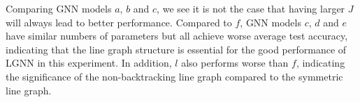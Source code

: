 \documentclass{article} \usepackage{iclr2019_conference,times}
\begin{document}
Comparing GNN models $a$, $b$ and $c$, we see it is not the case that having larger $J$ will always lead to better performance. Compared to $f$, GNN models $c$, $d$ and $e$ have similar numbers of parameters but all achieve worse average test accuracy, indicating that the line graph structure is essential for the good performance of LGNN in this experiment. In addition, $l$ also performs worse than $f$, indicating the significance of the non-backtracking line graph compared to the symmetric line graph. 
\end{document}
